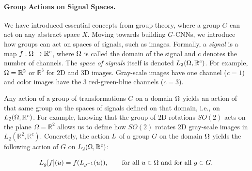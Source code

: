 
\paragraph{Group Actions on Signal Spaces.} We have introduced essential concepts from group theory, where a group $G$ can act on any abstract space $X$. Moving towards building $G$-CNNs, we introduce how groups can act on spaces of signals, such as images. Formally, a \textit{signal} is a map $f: \Omega \rightarrow \mathbb{R}^c$, where $\Omega$ is called the domain of the signal and $c$ denotes the number of channels. The \textit{space of signals }itself is denoted $L_2(\Omega, \mathbb{R}^c)$. For example, $\Omega=\mathbb{R}^2$ or $\mathbb{R}^3$ for 2D and 3D images. Gray-scale images have one channel ($c=1$) and color images have the 3 red-green-blue channels ($c=3$).


Any action of a group of transformations $G$ on a domain $\Omega$ yields an action of that same group on the spaces of signals defined on that domain, i.e., on $L_2(\Omega, \mathbb{R}^c)$. For example, knowing that the group of 2D rotations $SO(2)$ acts on the plane $\Omega = \mathbb{R}^2$ allows us to define how $SO(2)$ rotates 2D gray-scale images in $L_2(\mathbb{R}^2, \mathbb{R}^c)$. Concretely, the action $L$ of a group $G$ on the domain $\Omega$ yields the following action of $G$ on $L_2(\Omega, \mathbb{R}^c)$:

\begin{equation}
    L_g[f](u) = f(L_{g^{-1}}(u)), \qquad \text{for all $u \in \Omega$ and for all $g \in G$}.
\end{equation}


